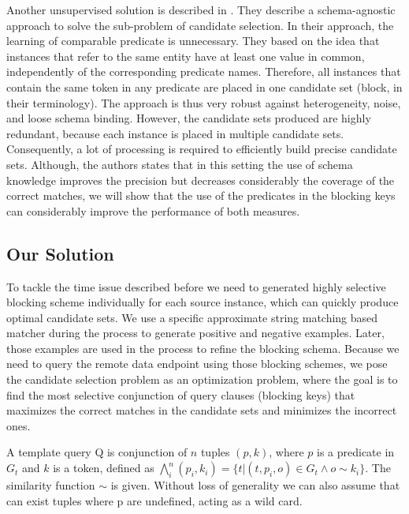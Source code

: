 Another unsupervised solution is described in \cite{DBLP:conf/wsdm/PapadakisINF11}. They describe  a schema-agnostic approach to solve the sub-problem of candidate selection. In their approach, the learning of comparable predicate is unnecessary. They based on the idea that instances that refer to the same entity have at least one value in common, independently of the corresponding predicate names. Therefore, all instances that contain the same token in any predicate are placed in one candidate set (block, in their terminology). The approach is thus very robust against heterogeneity, noise, and loose schema binding. However, the candidate sets produced are highly redundant, because each instance is placed in multiple candidate sets. Consequently, a lot of processing is required to efficiently build precise candidate sets. Although, the authors states that in this setting the use of schema knowledge improves the precision but decreases considerably the coverage of the correct matches, we will show that the use of the predicates in the blocking keys can considerably improve the performance of both measures. 

\subsection{Our Solution}

To tackle the time issue described before we need to generated highly selective blocking scheme individually for each source instance, which can quickly produce optimal candidate sets. We use a specific approximate string matching based matcher during the process to generate positive and negative examples. Later, those examples are used in the process to refine the blocking schema. Because we need to query the remote data endpoint using those blocking schemes, we pose the candidate selection problem as an optimization problem, where the goal is to find the most selective conjunction of query clauses (blocking keys) that maximizes the correct matches in the candidate sets and minimizes the incorrect ones.

\begin{definition}   A template query Q is conjunction of $n$ tuples $(p, k)$, where $p$ is a predicate in $G_t$ and $k$ is a token, defined as $ \bigwedge_{i}^n (p_i, k_i)=\{t | (t,p_i,o) \in G_t  \land o \sim k_i  \}$. The similarity function $\sim$ is given. Without loss of generality we can also assume that can exist tuples where p are undefined, acting as a wild card. 
\end{definition} 
 
